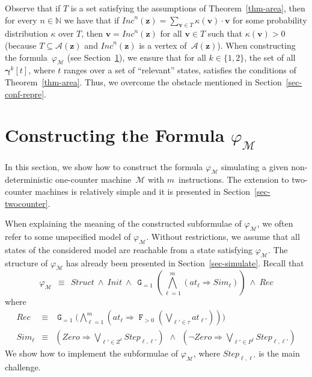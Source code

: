\documentclass[a4paper,UKenglish,cleveref, autoref, thm-restate]{lipics-v2021}
\newcommand{\N}{\mathbb{N}}
\newcommand{\M}{\mathcal{M}}
\newcommand{\Init}{\mathit{Init}}
\newcommand{\Simulate}{\mathit{Sim}}
\newcommand{\Step}{\mathit{Step}}
\newcommand{\Zero}{\mathit{Zero}}
\newcommand{\Area}{\mathcal{A}}
\newcommand{\at}{\mathit{at}}
\newcommand{\INC}{\mathit{Inc}}
\renewcommand{\vec}[1]{\pmb{#1}}
\newcommand{\Struct}{\textit{Struct}}
\newcommand{\Rec}{\textit{Rec}}
\newcommand{\cv}{\vec{\gamma}}
\newcommand*{\opf}{\operatorname{\pmb{\mathtt{F}}}}
\newcommand*{\opg}{\operatorname{\pmb{\mathtt{G}}}}
\begin{document}
Observe that if $T$ is a set satisfying the assumptions of Theorem~\ref{thm-area}, then for every $n \in \N$ we have that if $\INC^n(\vec{z}) = \sum_{\vec{v} \in T} \kappa(\vec{v}) \cdot \vec{v}$ for some probability distribution $\kappa$ over $T$, then $\vec{v} = \INC^n(\vec{z})$ for all $\vec{v} \in T$ such that $\kappa(\vec{v}) > 0$ (because $T \subseteq \Area(\vec{z})$ and $\INC^n(\vec{z})$ is a vertex of~$\Area(\vec{z})$). When constructing the formula~$\varphi_\M$ (see Section~\ref{sec-formula}), we ensure that for all $k \in \{1,2\}$, the set of all $\cv^k[t]$, where $t$ ranges over a set of ``relevant'' states, satisfies the conditions of Theorem~\ref{thm-area}. Thus, we overcome the obstacle mentioned in Section~\ref{sec-conf-repre}.
 \section{Constructing the Formula $\varphi_\M$}
\label{sec-formula}

In this section, we show how to construct the formula $\varphi_\M$ simulating a given non-deterministic one-counter machine~$\M$ with $m$~instructions. The extension to two-counter machines is relatively simple and it is presented in Section~\ref{sec-twocounter}. 

When explaining the meaning of the constructed subformulae of $\varphi_\M$, we often refer to some unspecified model of $\varphi_\M$. Without restrictions, we assume that all states of the considered model are reachable from a state satisfying $\varphi_\M$.
The structure of $\varphi_\M$ has already been presented in Section~\ref{sec-simulate}. Recall that
\begin{equation*}\textstyle
    \varphi_{\M} ~~\equiv~~ \Struct ~\wedge~ \Init ~\wedge~ 
       \opg_{=1} (\bigwedge_{\ell =1}^m (\at_\ell \Rightarrow \Simulate_\ell)) 
       ~\wedge~ \Rec
\end{equation*}
where
\begin{eqnarray*}
    \Rec & \equiv & \textstyle\opg_{=1}\big(\bigwedge_{\ell=1}^m (\at_\ell \Rightarrow \opf_{>0} (\bigvee_{\ell' \in \tau}\at_{\ell'}))\big)\\
    \Simulate_\ell & \equiv & \textstyle(\Zero \Rightarrow \bigvee_{\ell' \in Z^\ell} \Step_{\ell,\ell'}) ~~\wedge~~
    (\neg\Zero \Rightarrow \bigvee_{\ell' \in P^\ell} \Step_{\ell,\ell'})
\end{eqnarray*}
We show how to implement the subformulae of $\varphi_\M$, where $\Step_{\ell,\ell'}$ is the main challenge. 
\end{document}
